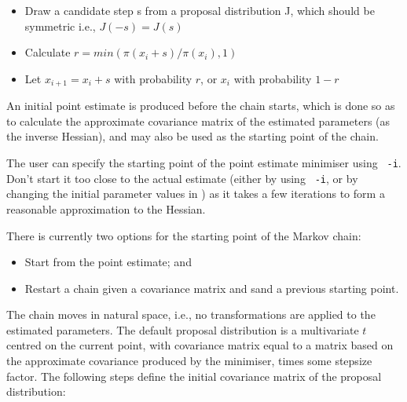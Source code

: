 \begin{itemize}
\item Draw a candidate step s from a proposal distribution J, which should be symmetric i.e., $J(-s)=J(s)$
\item Calculate $r=min(\pi(x_i+s)/\pi(x_i),1)$
\item Let $x_{i+1}=x_i+s$ with probability $r$, or $x_i$ with probability $1-r$
\end{itemize}

An initial point estimate is produced before the chain starts, which is done so as to calculate the approximate covariance matrix of the estimated parameters (as the inverse Hessian), and may also be used as the starting point of the chain.

The user can specify the starting point of the point estimate minimiser using \texttt{\cname\ -i}. Don't start it too close to the actual estimate (either by using \texttt{\cname\ -i}, or by changing the initial parameter values in \config) as it takes a few iterations to form a reasonable approximation to the Hessian.

There is currently two options for the starting point of the Markov chain:

\begin{itemize}
\item Start from the point estimate; and
\item Restart a chain given a covariance matrix and sand a previous starting point.
\end{itemize}

The chain moves in natural space, i.e., no transformations are applied to the estimated parameters. The default proposal distribution is a multivariate $t$ centred on the current point, with covariance matrix equal to a matrix based on the approximate covariance produced by the minimiser, times some stepsize factor. The following steps define the initial covariance matrix of the proposal distribution:

